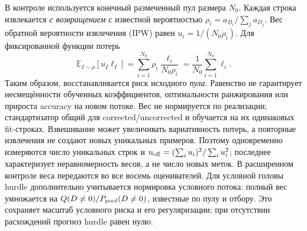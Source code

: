 В контроле используется конечный размеченный пул размера $N_0$.
Каждая строка извлекается \emph{с возвращением} с известной
вероятностью $\rho_i=a_{D_i}/\sum_j a_{D_j}$.
Вес обратной вероятности извлечения (IPW) равен
$u_i=1/(N_0\rho_i)$. Для фиксированной функции потерь
\begin{equation}\label{eq:ipw}
\mathbb E_{I\sim\rho}[u_I\ell_I]
=\sum_{i=1}^{N_0}\rho_i\frac{\ell_i}{N_0\rho_i}
=\frac{1}{N_0}\sum_{i=1}^{N_0}\ell_i.
\end{equation}
Таким образом, восстанавливается риск исходного \emph{пула}.
Равенство не гарантирует несмещённости обученных коэффициентов,
оптимальности ранжирования или прироста accuracy на новом потоке.
Вес не нормируется по реализации; стандартизатор общий для
corrected/uncorrected и обучается на их одинаковых fit-строках.
Взвешивание может увеличивать вариативность потерь, а повторные извлечения
не создают новых уникальных примеров. Поэтому одновременно измеряются
число уникальных строк и $n_{\rm eff}=(\sum_i u_i)^2/\sum_i u_i^2$;
последнее характеризует неравномерность весов, а не число новых меток.
В расширенном контроле веса передаются во все восемь оценивателей.
Для условной головы hurdle дополнительно учитывается нормировка
условного потока: полный вес умножается на
$Q(D\ne0)/P_{\rm pool}(D\ne0)$, известные по пулу и отбору.
Это сохраняет масштаб условного риска и его регуляризации;
при отсутствии расхождений прогноз hurdle равен нулю.

